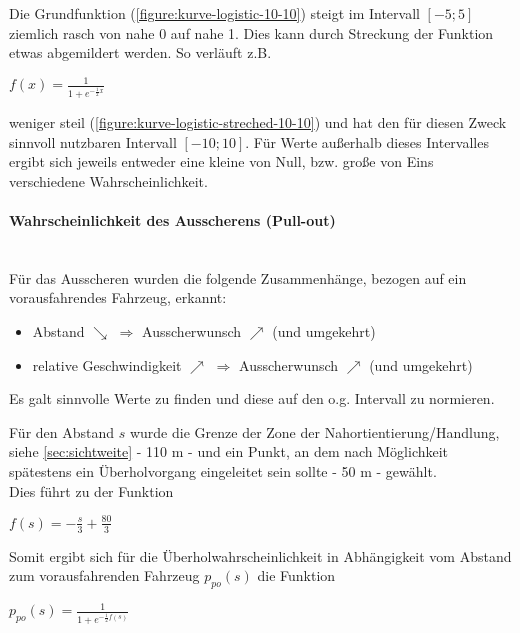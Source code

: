 \noindent
Die Grundfunktion (\cref{figure:kurve-logistic-10-10}) steigt im Intervall $ [-5; 5] $ ziemlich rasch von nahe 0 auf nahe 1.
Dies kann durch Streckung der Funktion etwas abgemildert werden.
So verläuft z.B. 
\begin{center}
$ f(x) = \frac{1}{1 + e^{-\frac{1}{2}x}} $ 
\end{center}
weniger steil (\cref{figure:kurve-logistic-streched-10-10}) und hat den für diesen Zweck sinnvoll nutzbaren Intervall $ [-10; 10 ] $.
Für Werte außerhalb dieses Intervalles ergibt sich jeweils entweder eine kleine von Null, bzw. große von Eins verschiedene Wahrscheinlichkeit.

\paragraph*{Wahrscheinlichkeit des Ausscherens (Pull-out)} 
\hfill \\
Für das Ausscheren wurden die folgende Zusammenhänge, bezogen auf ein vorausfahrendes Fahrzeug, erkannt:
\begin{itemize}
    \itemsep0em
    \item Abstand $ \searrow $  $ \Longrightarrow $ Ausscherwunsch $ \nearrow $ (und umgekehrt)
    \item relative Geschwindigkeit $ \nearrow $ $ \Longrightarrow $ Ausscherwunsch $ \nearrow $ (und umgekehrt)
\end{itemize}

Es galt sinnvolle Werte zu finden und diese auf den o.g. Intervall zu normieren.

Für den Abstand $ s $ wurde die Grenze der Zone der Nahortientierung/Handlung, siehe \cref{sec:sichtweite} - 110 m - und ein Punkt, an dem nach Möglichkeit spätestens ein Überholvorgang eingeleitet sein sollte - 50 m - gewählt.
\\
Dies führt zu der Funktion
\begin{center}
$ f(s) = -\frac{s}{3} + \frac{80}{3} $
\end{center}
Somit ergibt sich für die Überholwahrscheinlichkeit in Abhängigkeit vom Abstand zum vorausfahrenden Fahrzeug $ p_{po}(s) $ die Funktion
\begin{center}
$ p_{po}(s) = \frac{1}{1 + e^{-\frac{1}{2}f(s)}} $
\end{center}


